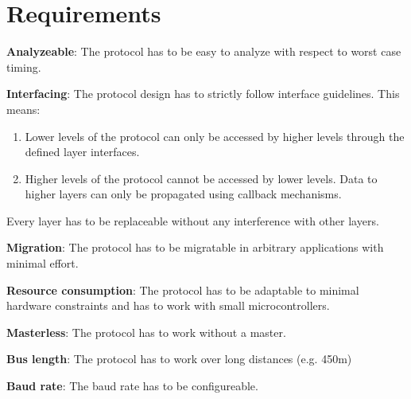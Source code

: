 \section{Requirements}
\label{sec:bus:requirements}

\begin{req}
\label{req:ulftrtp:analyzeable}
\textbf{Analyzeable}: The protocol has to be easy to analyze with respect to worst case timing.
\end{req}

\begin{req}
\label{req:ulftrtp:interfacing}
\textbf{Interfacing}: The protocol design has to strictly follow interface guidelines. This means:
\begin{enumerate}
 \item Lower levels of the protocol can only be accessed by higher levels through the defined layer interfaces.
 \item Higher levels of the protocol cannot be accessed by lower levels. Data to higher layers can only be propagated 
using callback mechanisms. 
\end{enumerate}
Every layer has to be replaceable without any interference with other layers.
\end{req}

\begin{req}
\label{req:ulftrtp:easy migration}
\textbf{Migration}: The protocol has to be migratable in arbitrary applications with minimal effort.
\end{req}

\begin{req}
\label{req:ulftrtp:resource consumption}
\textbf{Resource consumption}: The protocol has to be adaptable to minimal hardware constraints and has to work 
 with small microcontrollers.
\end{req}

\begin{req}
\label{req:ulftrtp:masterless}
\textbf{Masterless}: The protocol has to work without a master.
\end{req}

\begin{req}
\label{req:ulftrtp:length}
\textbf{Bus length}: The protocol has to work over long distances (e.g. 450m)
\end{req}

\begin{req}
\label{req:ulftrtp:baudrate}
\textbf{Baud rate}: The baud rate has to be configureable.
\end{req}

